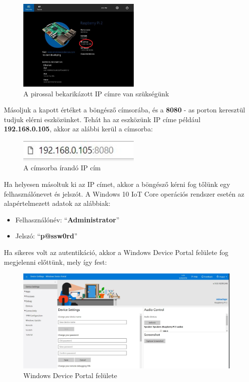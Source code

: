 \documentclass[a4paper,12pt]{report}
\begin{document}
    \begin{figure}[h!]
        \hspace{5cm}
        \includegraphics[width=6cm]{images/rpiip.jpg}
        \caption{A pirossal bekarikázott IP címre van szükségünk}
        \label{fig: Raspberry IP}
    \end{figure}

    Másoljuk a kapott értéket a böngésző címsorába, és a \textbf{8080} - as porton keresztül tudjuk elérni eszközünket.
    Tehát ha az eszközünk IP címe például \textbf{192.168.0.105}, akkor az alábbi kerül a címsorba:

    \begin{figure}[h!]
        \hspace{5cm}
        \includegraphics[width=6cm]{images/browserrpi.jpg}
        \caption{A címsorba írandó IP cím}
        \label{fig: Raspberry IP Browser}
    \end{figure}

    Ha helyesen másoltuk ki az IP címet, akkor a böngésző kérni fog tőlünk egy felhasználónevet és jelszót. A Windows 10 IoT Core
    operációs rendszer esetén az alapértelmezett adatok az alábbiak:

    \begin{itemize}
        \item Felhasználónév: ``\textbf{Administrator}''
        \item Jelszó: ``\textbf{p@ssw0rd}''
    \end{itemize}

    Ha sikeres volt az autentikáció, akkor a Windows Device Portal felülete fog megjelenni előttünk, mely így fest:

    \begin{figure}[h!]
        \includegraphics[width=\linewidth]{images/deviceportal.jpg}
        \caption{Windows Device Portal felülete}
        \label{fig: Windows Device Portal}
    \end{figure}
\end{document}
